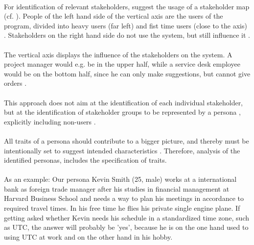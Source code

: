 \paragraph{} For identification of relevant stakeholders, \textcite[38]{Robier.2016} suggest the usage of a stakeholder map (cf. ). People of the left hand side of the vertical axis are the users of the program, divided into heavy users (far left) and fist time users (close to the axis) \parencite[cf.][38]{Robier.2016}. Stakeholders on the right hand side do not use the system, but still influence it \parencite[cf.][38]{Robier.2016}. 

\paragraph{} The vertical axis displays the influence of the stakeholders on the system. A project manager would e.g. be in the upper half, while a service desk employee would be on the bottom half, since he can only make suggestions, but cannot give orders \parencite[cf.][38]{Robier.2016}. 

\paragraph{} This approach does not aim at the identification of each individual stakeholder, but at the identification of stakeholder groups to be represented by a persona \parencite[cf.][82]{Cooper.2007}, explicitly  including non-users \parencite[cf.][84]{Cooper.2007}.

\paragraph{} All traits of a persona should contribute to a bigger picture, and thereby must be intentionally set to suggest intended characteristics \parencite[cf.]{Platt.2016}. Therefore, analysis of the identified personas, includes the specification of traits. 

\paragraph{} As an example: Our persona Kevin Smith (25, male) works at a international bank as foreign trade manager after his studies in financial management at Harvard Business School and needs a way to plan his meetings in accordance to required travel times. In his free time he flies his private single engine plane. If getting asked  whether Kevin needs his schedule in a standardized time zone, such as UTC, the answer will probably be 'yes', because he is on the one hand used to using UTC at work and on the other hand in his hobby. 

